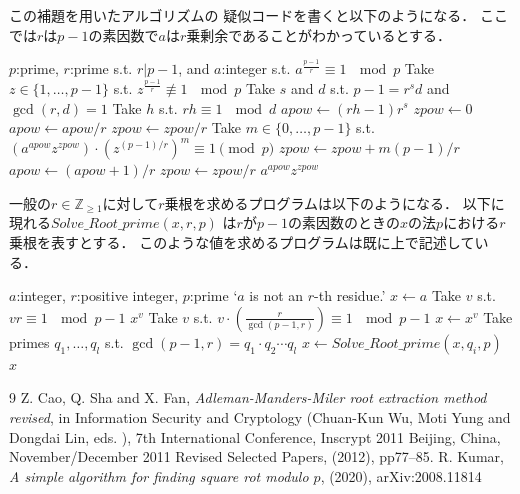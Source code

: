 \documentclass[leqno]{jsarticle}
\newcommand{\zz}{\mathbb{Z}}
\begin{document}
この補題を用いたアルゴリズムの
疑似コードを書くと以下のようになる．
ここでは$r$は$p-1$の素因数で$a$は$r$乗剰余であることがわかっているとする．
\begin{algorithm}
\caption{Solving $x^r\equiv a\ \mod p$}
\begin{algorithmic}
\REQUIRE $p$:prime, $r$:prime s.t. $r|p-1$, and $a$:integer s.t.  
$a^{\frac{p-1}{r}}\equiv 1\ \mod p$
\STATE Take $z\in \{1, \dots, p-1\}$ s.t. $z^{\frac{p-1}{r}}\not \equiv 1 \ \mod p$
\STATE Take $s$ and $d$ s.t. $p-1=r^sd$ and $\gcd(r, d)=1$
\STATE Take $h$ s.t. $rh\equiv 1\ \mod d$
\STATE  $apow\leftarrow (rh-1)r^s$
\STATE  $zpow\leftarrow 0$
\STATE $apow\leftarrow apow/r$
\STATE $zpow\leftarrow zpow/r$
\STATE Take $m\in \{0, \dots, p-1\}$ s.t. 
$\left(a^{apow}z^{zpow}\right)\cdot \left(z^{(p-1)/r}\right)^{m}\equiv 1\pmod{p}$
\STATE $zpow\leftarrow zpow + m(p-1)/r$
\ENDIF
\ENDWHILE
\STATE $apow\leftarrow (apow+1)/r$
\STATE  $zpow \leftarrow zpow/r$
\RETURN $a^{apow}z^{zpow}$
\end{algorithmic}
\end{algorithm}




一般の$r\in \zz_{\ge 1}$に対して$r$乗根を求めるプログラムは以下のようになる．
以下に現れる$Solve\_Root\_prime(x, r, p)$
は$r$が$p-1$の素因数のときの$x$の法$p$における$r$乗根を表すとする．
このような値を求めるプログラムは既に上で記述している．


\begin{algorithm}
\caption{Solving $x^r\equiv a\ \mod p$}
\begin{algorithmic}
\REQUIRE $a$:integer, $r$:positive integer,  $p$:prime 
\RETURN `$a$ is not an $r$-th residue.'
\ENDIF
\STATE $x\gets a$
\STATE Take $v$ s.t. $vr\equiv 1\ \mod p-1$
\RETURN $x^v$
\ELSE
\STATE Take $v$ s.t. $v\cdot \left(\frac{r}{\gcd(p-1, r)}\right)\equiv 1\ \mod p-1$
\STATE $x\gets x^v$
\ENDIF
\STATE Take primes $q_1, \dots, q_l$ s.t. 
$\gcd(p-1, r)=q_1\cdot q_2\cdots q_l$
\STATE $x\gets Solve\_Root\_prime(x, q_i, p)$
\ENDFOR
\RETURN $x$
\end{algorithmic}

\end{algorithm}






	
\begin{thebibliography}{9}
Z. Cao, Q. Sha and X. Fan, 
\textit{Adleman-Manders-Miler root extraction method revised}, 
in Information Security and Cryptology (Chuan-Kun Wu, Moti Yung and 
Dongdai Lin,  eds. ), 7th International Conference, Inscrypt 2011
Beijing, China, November/December 2011
Revised Selected Papers,
(2012), pp77--85. 
R. Kumar, \textit{A simple algorithm for finding square rot modulo $p$}, 
(2020), arXiv:2008.11814 
\end{thebibliography}




			
\end{document}
